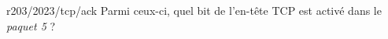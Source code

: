 \begin{question}{r203/2023/tcp/ack}
  Parmi ceux-ci, quel bit de l'en-tête TCP est activé dans le {\em
    paquet 5} ?
  \begin{reponses}
  \end{reponses}
\end{question}
